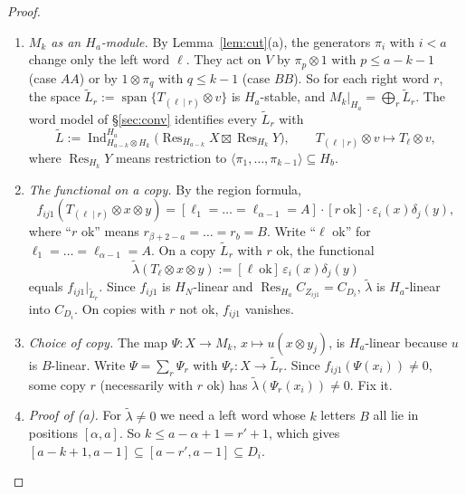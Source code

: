 \documentclass[11pt]{amsart}
\newcommand{\Ind}{\operatorname{Ind}}
\newcommand{\Res}{\operatorname{Res}}
\newcommand{\sq}{\boxtimes}
\newcommand{\ok}{\mathrm{ok}}
\theoremstyle{plain}
\theoremstyle{definition}
\begin{document}
\begin{proof}
\begin{enumerate}[label=\textup{Step \arabic*.},leftmargin=3.6em,itemsep=3pt]
\item \emph{$M_k$ as an $H_a$-module.} By Lemma~\ref{lem:cut}(a), the generators $\pi_i$ with $i<a$ change only the left word $\ell$. They act on $V$ by $\pi_p\otimes1$ with $p\le a-k-1$ (case $AA$) or by $1\otimes\pi_q$ with $q\le k-1$ (case $BB$). So for each right word $r$, the space $\widetilde L_r:=\operatorname{span}\{T_{(\ell\mid r)}\otimes v\}$ is $H_a$-stable, and $M_k|_{H_a}=\bigoplus_r\widetilde L_r$. The word model of \S\ref{sec:conv} identifies every $\widetilde L_r$ with
\[
\widetilde L:=\Ind_{H_{a-k}\otimes H_k}^{H_a}\bigl(\Res_{H_{a-k}}X\sq\Res_{H_k}Y\bigr),\qquad T_{(\ell\mid r)}\otimes v\mapsto T_\ell\otimes v,
\]
where $\Res_{H_k}Y$ means restriction to $\langle\pi_1,\dots,\pi_{k-1}\rangle\subseteq H_b$.
\item \emph{The functional on a copy.} By the region formula,
\[
f_{ij1}(T_{(\ell\mid r)}\otimes x\otimes y)=[\ell_1=\dots=\ell_{\alpha-1}=A]\cdot[r\ \ok]\cdot\varepsilon_i(x)\delta_j(y),
\]
where ``$r$ ok'' means $r_{\beta+2-a}=\dots=r_b=B$. Write ``$\ell$ ok'' for $\ell_1=\dots=\ell_{\alpha-1}=A$. On a copy $\widetilde L_r$ with $r$ ok, the functional
\[
\widetilde\lambda(T_\ell\otimes x\otimes y):=[\ell\ \ok]\,\varepsilon_i(x)\delta_j(y)
\]
equals $f_{ij1}|_{\widetilde L_r}$. Since $f_{ij1}$ is $H_N$-linear and $\Res_{H_a}C_{Z_{ij1}}=C_{D_i}$, $\widetilde\lambda$ is $H_a$-linear into $C_{D_i}$. On copies with $r$ not ok, $f_{ij1}$ vanishes.
\item \emph{Choice of copy.} The map $\Psi:X\to M_k$, $x\mapsto u(x\otimes y_j)$, is $H_a$-linear because $u$ is $B$-linear. Write $\Psi=\sum_r\Psi_r$ with $\Psi_r:X\to\widetilde L_r$. Since $f_{ij1}(\Psi(x_i))\ne0$, some copy $r$ (necessarily with $r$ ok) has $\widetilde\lambda(\Psi_r(x_i))\ne0$. Fix it.
\item \emph{Proof of (a).} For $\widetilde\lambda\neq0$ we need a left word whose $k$ letters $B$ all lie in positions $[\alpha,a]$. So $k\le a-\alpha+1=r'+1$, which gives $[a-k+1,a-1]\subseteq[a-r',a-1]\subseteq D_i$.


\end{enumerate}
\end{proof}
\end{document}
